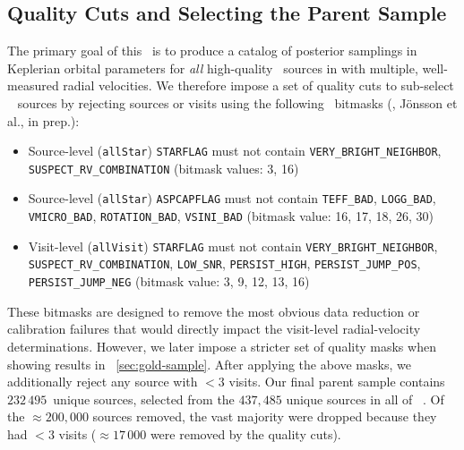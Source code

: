 \documentclass[modern]{aastex63}
\newcommand{\nsources}{\ensuremath{232\,495}}
\begin{document}
\subsection{Quality Cuts and Selecting the Parent Sample}

The primary goal of this \documentname\ is to produce a catalog of posterior
samplings in Keplerian orbital parameters for \emph{all} high-quality \apogee\
sources in  with multiple, well-measured radial velocities.
We therefore impose a set of quality cuts to sub-select \apogee\  sources
by rejecting sources or visits using the following \apogee\
bitmasks (\citealt{Holtzman:2018}, J\"onsson et al., in prep.):
\begin{itemize}
    \item Source-level (\texttt{allStar}) \texttt{STARFLAG} must not contain
    \texttt{VERY\_BRIGHT\_NEIGHBOR}, \texttt{SUSPECT\_RV\_COMBINATION} (bitmask
    values: 3, 16)
    \item Source-level (\texttt{allStar}) \texttt{ASPCAPFLAG} must not contain
    \texttt{TEFF\_BAD}, \texttt{LOGG\_BAD}, \texttt{VMICRO\_BAD},
    \texttt{ROTATION\_BAD}, \texttt{VSINI\_BAD} (bitmask value: 16, 17, 18, 26,
    30)
    \item Visit-level (\texttt{allVisit}) \texttt{STARFLAG} must not contain
    \texttt{VERY\_BRIGHT\_NEIGHBOR}, \texttt{SUSPECT\_RV\_COMBINATION},
    \texttt{LOW\_SNR}, \texttt{PERSIST\_HIGH}, \texttt{PERSIST\_JUMP\_POS},
    \texttt{PERSIST\_JUMP\_NEG} (bitmask value: 3, 9, 12, 13, 16)
\end{itemize}
These bitmasks are designed to remove the most obvious data reduction or
calibration failures that would directly impact the visit-level radial-velocity
determinations.
However, we later impose a stricter set of quality masks when showing results in
\sectionname~\ref{sec:gold-sample}.
After applying the above masks, we additionally reject any source with $<3$
visits.
Our final parent sample contains \nsources\ unique sources, selected from the
$437,485$ unique sources in all of \apogee\ .
Of the $\approx$$200,000$ sources removed, the vast majority were dropped
because they had $<3$ visits ($\approx$$17\,000$ were removed by the quality
cuts).

\end{document}
